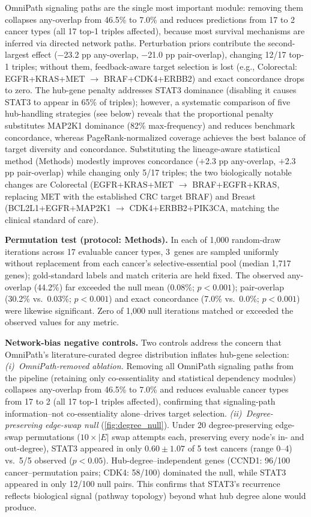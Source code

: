 \documentclass[times, twoside, watermark]{zHenriquesLab-StyleBioRxiv}
\begin{document}

OmniPath signaling paths are the single most important module: removing them collapses any-overlap from 46.5\% to 7.0\% and reduces predictions from 17 to 2 cancer types (all 17 top-1 triples affected), because most survival mechanisms are inferred via directed network paths. Perturbation priors contribute the second-largest effect ($-$23.2 pp any-overlap, $-$21.0 pp pair-overlap), changing 12/17 top-1 triples; without them, feedback-aware target selection is lost (e.g., Colorectal: EGFR+KRAS+MET $\to$ BRAF+CDK4+ERBB2) and exact concordance drops to zero. The hub-gene penalty addresses STAT3 dominance (disabling it causes STAT3 to appear in 65\% of triples); however, a systematic comparison of five hub-handling strategies (see below) reveals that the proportional penalty substitutes MAP2K1 dominance (82\% max-frequency) and reduces benchmark concordance, whereas PageRank-normalized coverage achieves the best balance of target diversity and concordance. Substituting the lineage-aware statistical method (Methods) modestly improves concordance ($+$2.3 pp any-overlap, $+$2.3 pp pair-overlap) while changing only 5/17 triples; the two biologically notable changes are Colorectal (EGFR+KRAS+MET $\to$ BRAF+EGFR+KRAS, replacing MET with the established CRC target BRAF) and Breast (BCL2L1+EGFR+MAP2K1 $\to$ CDK4+ERBB2+PIK3CA, matching the clinical standard of care).

\textbf{Permutation test (protocol: Methods).} In each of 1{,}000 random-draw iterations across 17 evaluable cancer types, 3~genes are sampled uniformly without replacement from each cancer's selective-essential pool (median 1{,}717 genes); gold-standard labels and match criteria are held fixed. The observed any-overlap (44.2\%) far exceeded the null mean (0.08\%; $p < 0.001$); pair-overlap (30.2\% vs.\ 0.03\%; $p < 0.001$) and exact concordance (7.0\% vs.\ 0.0\%; $p < 0.001$) were likewise significant. Zero of 1{,}000 null iterations matched or exceeded the observed values for any metric.

\textbf{Network-bias negative controls.} Two controls address the concern that OmniPath's literature-curated degree distribution inflates hub-gene selection:
\emph{(i)~OmniPath-removed ablation.} Removing all OmniPath signaling paths from the pipeline (retaining only co-essentiality and statistical dependency modules) collapses any-overlap from 46.5\% to 7.0\% and reduces evaluable cancer types from 17 to 2 (all 17 top-1 triples affected), confirming that signaling-path information--not co-essentiality alone--drives target selection.
\emph{(ii)~Degree-preserving edge-swap null} (\cref{fig:degree_null}). Under 20 degree-preserving edge-swap permutations ($10\times|E|$ swap attempts each, preserving every node's in- and out-degree), STAT3 appeared in only $0.60 \pm 1.07$ of 5 test cancers (range 0--4) vs.\ 5/5 observed ($p < 0.05$). Hub-degree--independent genes (CCND1: 96/100 cancer--permutation pairs; CDK4: 58/100) dominated the null, while STAT3 appeared in only 12/100 null pairs. This confirms that STAT3's recurrence reflects biological signal (pathway topology) beyond what hub degree alone would produce.
\end{document}
